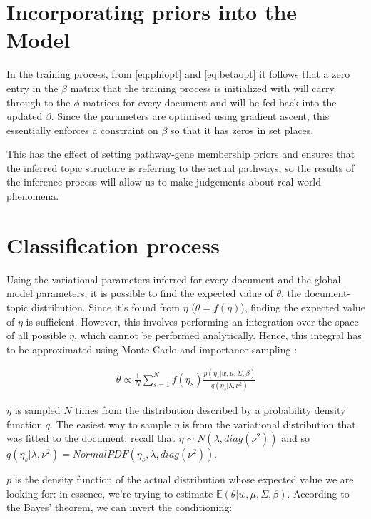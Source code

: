 \documentclass[12pt,a4paper,twoside,openright]{report}
\begin{document}


\section{Incorporating priors into the Model}

In the training process, from \eqref{eq:phiopt} and \eqref{eq:betaopt} it follows that a zero entry in the $\beta$ matrix that the training process is initialized with will carry through to the $\phi$ matrices for every document and will be fed back into the updated $\beta$. Since the parameters are optimised using gradient ascent, this essentially enforces a constraint on $\beta$ so that it has zeros in set places.

This has the effect of setting pathway-gene membership priors and ensures that the inferred topic structure is referring to the actual pathways, so the results of the inference process will allow us to make judgements about real-world phenomena.

\section{Classification process}

Using the variational parameters inferred for every document and the global model parameters, it is possible to find the expected value of $\theta$, the document-topic distribution. Since it's found from $\eta$ ($\theta = f(\eta)$), finding the expected value of $\eta$ is sufficient. However, this involves performing an integration over the space of all possible $\eta$, which cannot be performed analytically. Hence, this integral has to be approximated using Monte Carlo and importance sampling \cite{mcbook}:

\begin{align}
\hat\theta \propto \frac{1}{N}\sum\limits_{s=1}^N f(\eta_s) \frac{p(\eta_s | w, \mu, \Sigma, \beta)}{q(\eta_s | \lambda, \nu^2)}
\end{align}

$\eta$ is sampled $N$ times from the distribution described by a probability density function $q$. The easiest way to sample $\eta$ is from the variational distribution that was fitted to the document: recall that $\eta \sim N(\lambda, \mathit{diag}(\nu^2))$ and so $q(\eta_s | \lambda, \nu^2) = \mathit{NormalPDF}(\eta_s, \lambda, \mathit{diag}(\nu^2))$.

$p$ is the density function of the actual distribution whose expected value we are looking for: in essence, we're trying to estimate $\mathbb{E}(\theta | w, \mu, \Sigma, \beta)$. According to the Bayes' theorem, we can invert the conditioning:
\end{document}
